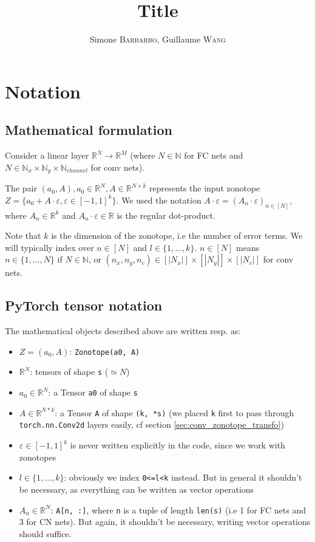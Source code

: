 \documentclass{article}
\title{Title}
\author{Simone \textsc{Barbarbo}, Guillaume \textsc{Wang}}
\newcommand{\code}[1]{\texttt{#1}}
\newcommand{\RR}{\mathbb{R}}
\newcommand{\NN}{\mathbb{N}}
\newcommand{\eps}{\varepsilon}
\begin{document}

\section{Notation}

\subsection{Mathematical formulation}

Consider a linear layer $\RR^N \to \RR^M$ (where $N \in \NN$ for FC nets and $N \in \NN_x \times \NN_y \times \NN_{channel}$ for conv nets).

The pair $(a_0, A), a_0 \in \RR^N, A \in \RR^{N \times k}$ represents the input zonotope $Z = \{ a_0 + A \cdot \eps, \eps \in [-1, 1]^k \}$. We used the notation $A \cdot \eps = (A_n \cdot \eps)_{n \in [N]}$, where $A_n \in \RR^k$ and $A_n \cdot \eps \in \RR$ is the regular dot-product.

Note that $k$ is the dimension of the zonotope, i.e the number of error terms. We will typically index over $n \in [N]$ and $l \in \{1,..., k\}$. 
$n \in [N]$ means $n \in \{1,...,N\}$ if $N \in \NN$, or $(n_x, n_y, n_c) \in [|N_x|] \times [|N_y|] \times [|N_c|]$ for conv nets.

\subsection{PyTorch tensor notation}

The mathematical objects described above are written resp. as:
\begin{itemize}
    \item $Z = (a_0, A)$: \code{Zonotope(a0, A)}
    \item $\RR^N$: tensors of shape \code{s} ($\simeq N$)
    \item $a_0 \in \RR^N$: a Tensor \code{a0} of shape \code{s}
    \item $A \in \RR^{N*k}$: a Tensor \code{A} of shape \code{(k, *s)} (we placed \code{k} first to pass through \code{torch.nn.Conv2d} layers easily, cf section \ref{sec:conv_zonotope_transfo})
    \item $\eps \in [-1, 1]^k$ is never written explicitly in the code, since we work with zonotopes
    \item $l \in \{1,...,k\}$: obviously we index \code{0<=l<k} instead. But in general it shouldn't be necessary, as everything can be written as vector operations
    \item $A_n \in \RR^N$: \code{A[n, :]}, where \code{n} is a tuple of length \code{len(s)} (i.e 1 for FC nets and 3 for CN nets). But again, it shouldn't be necessary, writing vector operations should suffice.
\end{itemize}
\end{document}
